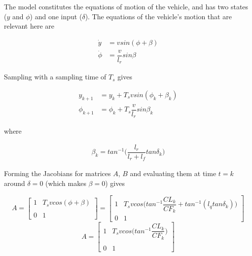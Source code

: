 \documentclass[oneside,12pt]{article}
\begin{document}
    The model constitutes the equations of motion of the vehicle, and has two
    states ($y$ and $\phi$) and one input ($\delta$). The equations of the
    vehicle's motion that are relevant here are

    \begin{align}
      \dot{y} &= v sin(\phi + \beta) \\
      \dot{\phi} &= \dfrac{v}{l_r} sin\beta
    \end{align}

    Sampling with a sampling time of $T_s$ gives

    \begin{align}
      y_{k+1} &= y_{k} + T_s v sin(\phi_k + \beta_k) \\
      \phi_{k+1} &= \phi_{k} + T_s \dfrac{v}{l_r} sin\beta_k
    \end{align}

    where

    \begin{align}
      \beta_k = tan^{-1}\Big(\dfrac{l_r}{l_r + l_f} tan\delta_k\Big)
    \end{align}


    Forming the Jacobians for matrices $A$, $B$ and evaluating them at time
    $t=k$ around $\delta = 0$ (which makes $\beta = 0$) gives

    \begin{equation}
     A =
      \begin{bmatrix}
        1 & T_s v cos(\phi + \beta) \\\\
        0 & 1
      \end{bmatrix}
      =
      \begin{bmatrix}
        1 & T_s v cos\Big(tan^{-1}\dfrac{CL_k}{CF_k} + tan^{-1} (l_q tan\delta_k)\Big) \\
        0 & 1
      \end{bmatrix}
    \end{equation}
    \begin{equation}
     A =
      \begin{bmatrix}
        1 & T_s v cos\Big(tan^{-1}\dfrac{CL_k}{CF_k}\Big) \\\\
        0 & 1
      \end{bmatrix}
    \end{equation}
\end{document}
